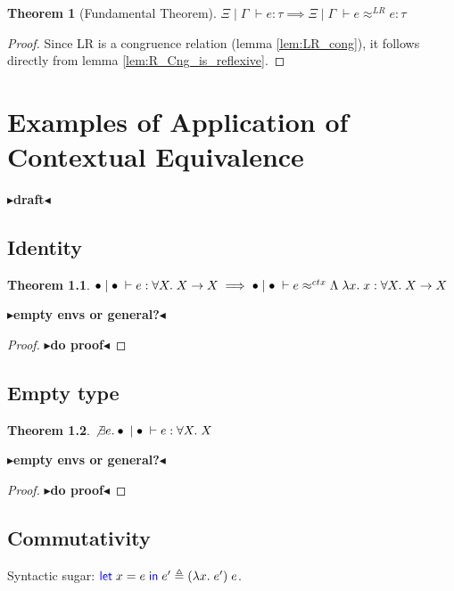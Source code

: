 \documentclass[twoside,11pt,openright]{report}
\newtheorem{theorem}{Theorem}
\theoremstyle{definition}
\newcommand{\var}{x}
\newcommand{\expr}{e}
\newcommand{\Tvar}{X}
\newcommand{\Tlam}{\Lambda\;}
\newcommand{\Tfunc}[2]{#1 \rightarrow #2}
\newcommand{\Tall}[2]{\forall #1.\; #2}
\newcommand{\typ}{\tau}
\newcommand{\venv}{\Gamma}
\newcommand{\tenv}{\Xi}
\newcommand{\emptenv}{\bullet}
\newcommand{\empvenv}{\bullet}
\newcommand{\jdg}[4]{#1 \; | \; #2 \; \vdash #3 : #4}
\newcommand{\jdgRel}[6]{#1 \; | \; #2 \; \vdash #3 \approx^{#4} #5 : #6}
\newcommand{\ctxRel}[5]{\jdgRel{#1}{#2}{#3}{ctx}{#4}{#5}}
\newcommand{\LogRel}[5]{\jdgRel{#1}{#2}{#3}{LR}{#4}{#5}}
\newcommand{\todo}[1]{{\color[rgb]{.5,0,0}\textbf{$\blacktriangleright$#1$\blacktriangleleft$}}}
\begin{document}
\begin{theorem}[Fundamental Theorem]
  $\jdg{\tenv}{\venv}{\expr}{\typ} \implies \LogRel{\tenv}{\venv}{\expr}{\expr}{\typ}$
\end{theorem}
\begin{proof}
  Since LR is a congruence relation (lemma \ref{lem:LR_cong}), it follows directly from lemma \ref{lem:R_Cng_is_reflexive}.
\end{proof}




\chapter{Examples of Application of Contextual Equivalence}
\label{ch:ACE}

\todo{draft}

\section{Identity}

\begin{theorem}
  $\jdg{\emptenv}{\empvenv}{\expr}{\Tall{\Tvar}{\Tfunc{\Tvar}{\Tvar}}} \implies \ctxRel{\emptenv}{\empvenv}{\expr}{\Tlam \fun \var . \var}{\Tall{\Tvar}{\Tfunc{\Tvar}{\Tvar}}}$
\end{theorem}
\todo{empty envs or general?}
\begin{proof}
  \todo{do proof}
\end{proof}


\section{Empty type}

\begin{theorem}
  $\not\exists \expr . \jdg{\emptenv}{\empvenv}{\expr}{\Tall{\Tvar}{\Tvar}}$
\end{theorem}
\todo{empty envs or general?}
\begin{proof}
  \todo{do proof}
\end{proof}

\section{Commutativity}

Syntactic sugar:
$\Let \var = \expr in \expr' \triangleq (\fun \var . \expr') \; \expr$.
\end{document}
